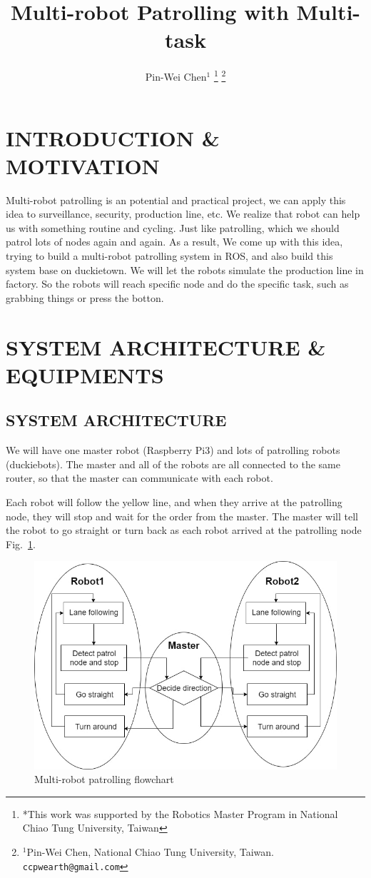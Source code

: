 \documentclass[letterpaper, 10 pt, conference]{ieeeconf}  %
\title{\LARGE \bf
Multi-robot Patrolling with Multi-task
}
\author{Pin-Wei Chen$^{1}$%
\thanks{*This work was supported by the Robotics Master Program in National Chiao Tung University, Taiwan}%
\thanks{$^{1}$Pin-Wei Chen, National Chiao Tung University, Taiwan.		{\tt\small ccpwearth@gmail.com}}%
}
\begin{document}
\maketitle
\thispagestyle{empty}
\pagestyle{empty}


\section{INTRODUCTION \& MOTIVATION}

Multi-robot patrolling is an potential and practical project, we can apply this idea to surveillance, security, production line, etc. We realize that robot can help us with something routine and cycling. Just like patrolling, which we should patrol lots of nodes again and again. As a result, We come up with this idea, trying to build a multi-robot patrolling system in ROS, and also build this system base on duckietown. We will let the robots simulate the production line in factory. So the robots will reach specific node and do the specific task, such as grabbing things or press the botton.

\section{SYSTEM ARCHITECTURE \& EQUIPMENTS}

\subsection{SYSTEM ARCHITECTURE}

We will have one master robot (Raspberry Pi3) and lots of patrolling robots (duckiebots). The master and all of the robots are all connected to the same router, so that the master can communicate with each robot.

Each robot will follow the yellow line, and when they arrive at the patrolling node, they will stop and wait for the order from the master. The master will tell the robot to go straight or turn back as each robot arrived at the patrolling node Fig.~\ref{figure:chart}.
\begin{figure}[h] %
\includegraphics[width=0.8\columnwidth]{flowchart}
\centering
\caption{Multi-robot patrolling flowchart}
\label{figure:chart}
\end{figure}
\end{document}
